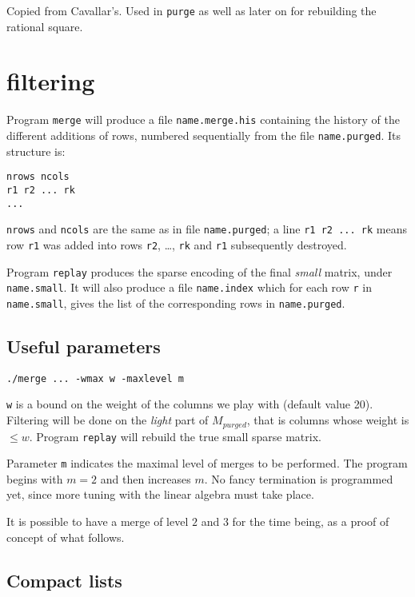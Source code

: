 \documentclass{article}
\begin{document}
Copied from Cavallar's. Used in \verb+purge+ as well as later on for
rebuilding the rational square.

\section{filtering}

Program \verb+merge+
will produce a file \verb+name.merge.his+ containing the history of
the different additions of rows, numbered sequentially from the file
\verb+name.purged+. Its structure is:
\begin{verbatim}
nrows ncols
r1 r2 ... rk
...
\end{verbatim}
\verb+nrows+ and \verb+ncols+ are the same as in file \verb+name.purged+;
a line \verb+r1 r2 ... rk+ means row \verb+r1+ was added into rows
\verb+r2+, \ldots, \verb+rk+ and \verb+r1+ subsequently destroyed.

Program \verb+replay+ produces the sparse encoding of the final {\em
small} matrix, under \verb+name.small+. It will also produce a file
\verb+name.index+ which for each row \verb+r+ in \verb+name.small+,
gives the list of the corresponding rows in \verb+name.purged+.

\subsection{Useful parameters}

\begin{verbatim}
./merge ... -wmax w -maxlevel m
\end{verbatim}
\verb+w+ is a bound on the weight of the columns we play
with (default value 20). Filtering will be done on the {\em light}
part of $M_{purged}$, that is columns whose weight is $\leq
w$. Program \verb+replay+ will rebuild the true small sparse matrix.

Parameter \verb+m+ indicates the maximal level of merges to be
performed. The program begins with $m=2$ and then increases $m$. No
fancy termination is programmed yet, since more tuning with the linear
algebra must take place.

It is possible to have a merge of level $2$ and $3$ for the time
being, as a proof of concept of what follows.

\subsection{Compact lists}
\end{document}
